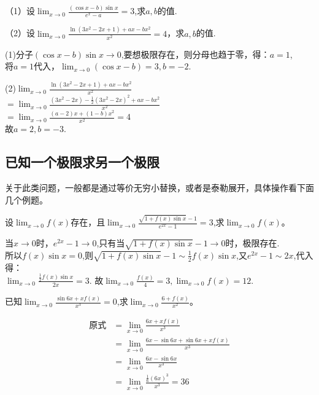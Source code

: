 \begin{example}
	（1）设$\lim_{x \to 0}\frac{(\cos x-b)\sin x}{e^x-a}=3$,求$a,b$的值.

	（2）设$\lim_{x \to 0}\frac{\ln(3x^2-2x+1)+ax-bx^2}{x^2}=4$，求$a,b$的值.
	\begin{solution}
		(1)分子$(\cos x-b)\sin x\to 0$,要想极限存在，则分母也趋于零，得：$a=1$,\\
		将$a=1$代入，$\lim_{x \to 0}(\cos x-b)=3,b=-2$.

		(2)$\lim_{x \to 0}\frac{\ln(3x^2-2x+1)+ax-bx^2}{x^2}$\\
		$=\lim_{x \to 0}\frac{(3x^2-2x)-\frac{1}{2}(3x^2-2x)^2+ax-bx^2}{x^2}$\\
		$=\lim_{x \to 0}\frac{(a-2)x+(1-b)x^2}{x^2}=4$\\
		故$a=2,b=-3$.
	\end{solution}
\end{example}

\subsection{已知一个极限求另一个极限}
关于此类问题，一般都是通过等价无穷小替换，或者是泰勒展开，具体操作看下面几个例题。

\begin{example}
	设$\lim_{x \to 0}f(x)$存在，且$\lim_{x \to 0}\frac{\sqrt{1+f(x)\sin x}-1}{e^{2x}-1}=3$,求$\lim_{x \to 0}f(x)$。
	\begin{solution}
		当$x\to 0$时，$e^{2x}-1\to 0$,只有当$\sqrt{1+f(x)\sin x}-1 \to 0$时，极限存在.\\
所以$f(x)\sin x=0$,则$\sqrt{1+f(x)\sin x}-1\sim \frac{1}{2}f(x)\sin x$,又$e^{2x}-1\sim 2x$,代入得：\\
$\lim_{x \to 0}\frac{\frac{1}{2}f(x)\sin x}{2x}=3	$.
故$\lim_{x \to 0}\frac{f(x)}{4}=3,\lim_{x \to 0}f(x)=12$.
	\end{solution}
\end{example}

\begin{example}
	已知$\lim_{x \to 0}\frac{\sin 6x+xf(x)}{x^3}=0$,求$\lim_{x \to 0}\frac{6+f(x)}{x^2}$。
	\begin{solution}
		\begin{align*}
			\text{原式}&=\lim_{x \to 0}\frac{6x+xf(x)}{x^3}\\
			&=\lim_{x \to 0}\frac{6x-\sin 6x+\sin 6x+xf(x)}{x^3}\\
			&=\lim_{x \to 0}\frac{6x-\sin 6x}{x^3}\\
			&=\lim_{x \to 0}\frac{\frac{1}{6}(6x)^3}{x^3} = 36
		\end{align*}
	\end{solution}
\end{example}


